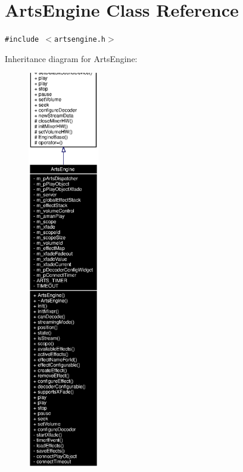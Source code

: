 \section{Arts\-Engine Class Reference}
\label{classArtsEngine}
{\tt \#include $<$artsengine.h$>$}

Inheritance diagram for Arts\-Engine:\begin{figure}[H]
\begin{center}
\leavevmode
\includegraphics[width=88pt]{classArtsEngine__inherit__graph}
\end{center}
\end{figure}
